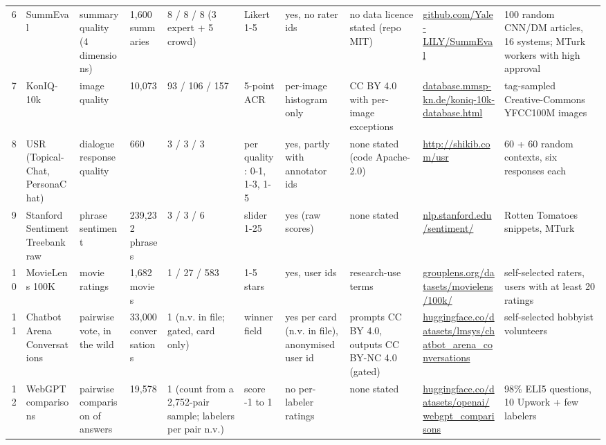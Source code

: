\documentclass[10pt]{article}
\begin{document}
\begin{longtable}{@{}r p{1.15in} p{1.0in} p{0.75in} p{0.8in} p{0.8in} p{0.9in} p{0.8in} p{1.2in} p{1.5in}@{}}
6 & SummEval & summary quality (4 dimensions) & 1,600 summaries & 8 / 8 / 8 (3 expert + 5 crowd) & Likert 1-5 & yes, no rater ids & no data licence stated (repo MIT) & \href{https://github.com/Yale-LILY/SummEval}{github.com/\allowbreak{}Yale-\allowbreak{}LILY/\allowbreak{}SummEval} & 100 random CNN/DM articles, 16 systems; MTurk workers with high approval \\
7 & KonIQ-10k & image quality & 10,073 & 93 / 106 / 157 & 5-point ACR & per-image histogram only & CC BY 4.0 with per-image exceptions & \href{https://database.mmsp-kn.de/koniq-10k-database.html}{database.mmsp-\allowbreak{}kn.de/\allowbreak{}koniq-\allowbreak{}10k-\allowbreak{}database.html} & tag-sampled Creative-Commons YFCC100M images \\
8 & USR (Topical-Chat, PersonaChat) & dialogue response quality & 660 & 3 / 3 / 3 & per quality: 0-1, 1-3, 1-5 & yes, partly with annotator ids & none stated (code Apache-2.0) & \href{http://shikib.com/usr}{http:/\allowbreak{}/\allowbreak{}shikib.com/\allowbreak{}usr} & 60 + 60 random contexts, six responses each \\
9 & Stanford Sentiment Treebank raw & phrase sentiment & 239,232 phrases & 3 / 3 / 6 & slider 1-25 & yes (raw scores) & none stated & \href{https://nlp.stanford.edu/sentiment/}{nlp.stanford.edu/\allowbreak{}sentiment/\allowbreak{}} & Rotten Tomatoes snippets, MTurk \\
10 & MovieLens 100K & movie ratings & 1,682 movies & 1 / 27 / 583 & 1-5 stars & yes, user ids & research-use terms & \href{https://grouplens.org/datasets/movielens/100k/}{grouplens.org/\allowbreak{}datasets/\allowbreak{}movielens/\allowbreak{}100k/\allowbreak{}} & self-selected raters, users with at least 20 ratings \\
11 & Chatbot Arena Conversations & pairwise vote, in the wild & 33,000 conversations & 1 (n.v. in file; gated, card only) & winner field & yes per card (n.v. in file), anonymised user id & prompts CC BY 4.0, outputs CC BY-NC 4.0 (gated) & \href{https://huggingface.co/datasets/lmsys/chatbot_arena_conversations}{huggingface.co/\allowbreak{}datasets/\allowbreak{}lmsys/\allowbreak{}chatbot\_arena\_conversations} & self-selected hobbyist volunteers \\
12 & WebGPT comparisons & pairwise comparison of answers & 19,578 & 1 (count from a 2,752-pair sample; labelers per pair n.v.) & score -1 to 1 & no per-labeler ratings & none stated & \href{https://huggingface.co/datasets/openai/webgpt_comparisons}{huggingface.co/\allowbreak{}datasets/\allowbreak{}openai/\allowbreak{}webgpt\_comparisons} & 98\% ELI5 questions, 10 Upwork + few labelers \\

\end{longtable}
\end{document}
